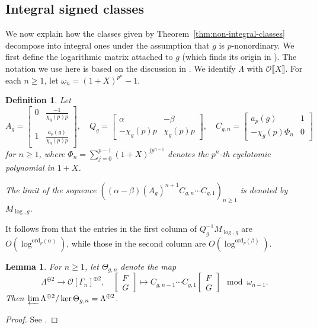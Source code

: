 \documentclass{amsart}
\numberwithin{equation}{section}
\newtheorem{lemma}[theorem]{Lemma}
\newtheorem{defn}[theorem]{Definition}
\newcommand{\ord}{\mathrm{ord}}
\newcommand{\cO}{\mathcal{O}}
\begin{document}
\subsection{Integral signed classes}\label{subsec:integralsignedclasses}


We now explain how the classes given by Theorem~\ref{thm:non-integral-classes} decompose into integral ones under the assumption that $g$ is $p$-nonordinary. We first define the logarithmic matrix attached to $g$ (which finds its origin in \cite{sprung09}). The notation we use here is based on the discussion in \cite[\S2.2]{BFSuper}. We identify $\Lambda$ with $\cO\llbracket X\rrbracket$. For each $n\ge1$, let $\omega_n=(1+X)^{p^n}-1$.
\begin{defn}\label{defn_01_11_25}
    Let 
    \[A_g=\begin{bmatrix}
    0&\frac{-1}{\chi_g(p)p}\\ \\ 1&\frac{a_p(g)}{\chi_g(p)p}
    \end{bmatrix},\quad  Q_g=\begin{bmatrix}
        \alpha&-\beta\\ -\chi_g(p)p& \chi_g(p)p
    \end{bmatrix},\quad C_{g,n}=\begin{bmatrix}
    a_p(g)&1\\ -\chi_g(p)\Phi_n&0
    \end{bmatrix}\] for $n\ge1$, where $\Phi_n=\sum_{j=0}^{p-1}(1+X)^{jp^{n-1}}$ denotes the $p^n$-th cyclotomic polynomial in $1+X$. 

    The limit of the sequence $((\alpha-\beta)(A_g)^{n+1}C_{g,n}\cdots C_{g,1})_{n\ge1}$ is denoted by $M_{\log,g}$.%
\end{defn}

It follows from \cite[Lemma~2.8]{BFSuper} that the entries in the first column of $Q_g^{-1}M_{\log,g}$ are $O(\log^{\ord_p(\alpha)})$, while those in the second column are $O(\log^{\ord_p(\beta)})$.


\begin{lemma}\label{lem:inverse-limit}
    For $n\ge1$, let $\Theta_{g,n}$ denote the map
    \[
   \Lambda^{\oplus 2}\rightarrow \cO[\Gamma_n]^{\oplus2},\quad \begin{bmatrix}
        F\\ G
    \end{bmatrix}\mapsto C_{g,n-1}\cdots C_{g,1}\begin{bmatrix}
        F\\ G
    \end{bmatrix}\mod \omega_{n-1}.
    \]
    Then $\displaystyle\varprojlim \Lambda^{\oplus 2}/\ker \Theta_{g,n}=\Lambda^{\oplus2}$.
\end{lemma}
\begin{proof}
See \cite[Lemma~2.9]{BFSuper}.
\end{proof}
\end{document}
